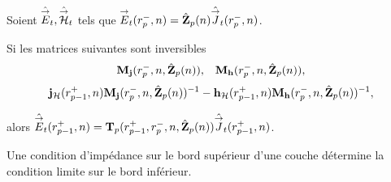     \begin{prop}%
      \label{prop:sphere:transfert:impedance}

      Soient \(\hat{{\overset{\rightarrow}{E}}}_t,\hat{{\overset{\rightarrow}{\mathcal{H}}}}_t\) tels que \({\overset{\rightarrow}{E}}_t(r_{p}^-,n) = \hat{\mathbf{Z}}_{p}(n)\hat{{\overset{\rightarrow}{J}}}_t(r_{p}^-,n)\).

      Si les matrices suivantes sont inversibles
      \begin{align*}
        \mathbf{M}_{\mathbf{j}}(r_p^-,n,\hat{\mathbf{Z}}_{p}(n)), && \mathbf{M}_{\mathbf{h}}(r_p^-,n,\hat{\mathbf{Z}}_{p}(n)),
      \end{align*}
      \begin{align*}
        \mathbf{j}_{\mathcal{H}}(r_{p-1}^+,n)\mathbf{M}_{\mathbf{j}}(r_{p}^-,n,\hat{\mathbf{Z}}_{p}(n))^{-1} - \mathbf{h}_{\mathcal{H}}(r_{p-1}^+,n)\mathbf{M}_{\mathbf{h}}(r_{p}^-,n,\hat{\mathbf{Z}}_{p}(n))^{-1},
      \end{align*}

      alors \(\hat{{\overset{\rightarrow}{E}}}_t(r_{p-1}^+,n) = \mathbf{T}_p(r_{p-1}^+,r_{p}^-,n,\hat{\mathbf{Z}}_{p}(n))\hat{{\overset{\rightarrow}{J}}}_t(r_{p-1}^+,n)\).

      Une condition d'impédance sur le bord supérieur d'une couche détermine la condition limite sur le bord inférieur.
    \end{prop}


